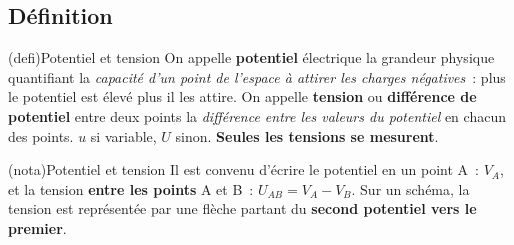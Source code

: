 \documentclass[../../main/main.tex]{subfiles}
\begin{document}
\subsection{Définition}
\begin{tcb*}[label=def:tension, sidebyside](defi){Potentiel et tension}
	On appelle \textbf{potentiel} électrique la grandeur physique quantifiant la
	\textit{capacité d'un point de l'espace à attirer les charges négatives}~:
	plus le potentiel est élevé plus il les attire.
	\bigbreak
	On appelle \textbf{tension} ou \textbf{différence de potentiel} entre deux
	points la \textit{différence entre les valeurs du potentiel} en chacun des
	points.
	\tcblower
	$u$ si variable, $U$ sinon.
	\textbf{Seules les tensions se mesurent}.
\end{tcb*}
\begin{tcb}[label=nota:tension, sidebyside, righthand ratio=.4](nota){Potentiel
			et tension}
	Il est convenu d'écrire le potentiel en un point A~: $V_A$, et la
	tension \textbf{entre les points} A et B~: $U_{AB} = V_A - V_B$. Sur un
	schéma, la tension est représentée par une flèche partant du
	\textbf{second potentiel vers le premier}.
	\tcblower
	\begin{center}
	\end{center}
\end{tcb}
\end{document}
